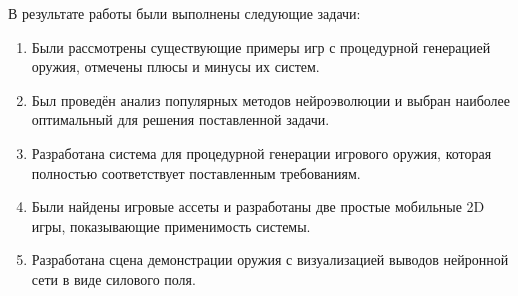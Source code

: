 ﻿

В результате работы были выполнены следующие задачи:

\begin{enumerate}[label=\textbullet]
    \item Были рассмотрены существующие примеры игр с процедурной генерацией оружия, отмечены плюсы и минусы их систем.
    \item Был проведён анализ популярных методов нейроэволюции и выбран наиболее оптимальный для решения поставленной задачи.
    \item Разработана система для процедурной генерации игрового оружия, которая полностью соответствует поставленным требованиям.
    \item Были найдены игровые ассеты и разработаны две простые мобильные 2D игры, показывающие применимость системы.
    \item Разработана сцена демонстрации оружия с визуализацией выводов нейронной сети в виде силового поля.
\end{enumerate}


\pagebreak

